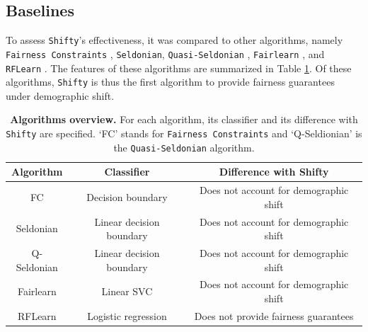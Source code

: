 \subsection{Baselines} \label{sec:baselines}
To assess \texttt{Shifty}'s effectiveness, it was compared to other algorithms, namely \texttt{Fairness Constraints} \cite{zafar2017fairness}, \texttt{Seldonian}, \texttt{Quasi-Seldonian} \cite{thomas2019preventing}, \texttt{Fairlearn} \cite{agarwal2018reductions}, and \texttt{RFLearn} \cite{du2021fair}. The features of these algorithms are summarized in Table \ref{tab:algorithms}. Of these algorithms, \texttt{Shifty} is thus the first algorithm to provide fairness guarantees under demographic shift.

\begin{table}[ht]
    \centering
    \footnotesize
    \begin{tabular}{c|c|c}
       Algorithm & Classifier & Difference with Shifty\\\hline
       FC & Decision boundary & Does not account for demographic shift\\
       Seldonian & Linear decision boundary & Does not account for demographic shift\\
       Q-Seldonian & Linear decision boundary & Does not account for demographic shift\\
       Fairlearn & Linear SVC & Does not account for demographic shift\\
       RFLearn & Logistic regression & Does not provide fairness guarantees\\
    \end{tabular}
    \caption{\textbf{Algorithms overview.} For each algorithm, its classifier and its difference with \texttt{Shifty} are specified. `FC' stands for \texttt{Fairness Constraints} and `Q-Seldionian' is the \texttt{Quasi-Seldonian} algorithm.}
    \label{tab:algorithms}
\end{table}


